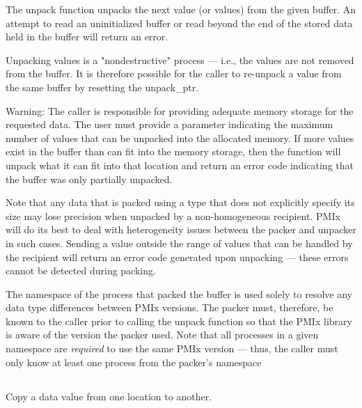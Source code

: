 \descr

The unpack function unpacks the next value (or values) from the given buffer. 
An attempt to read an uninitialized buffer or read beyond the end of the stored data held in the buffer will return an error.

Unpacking values is a "nondestructive" process --- i.e., the values are not removed from the buffer. It is therefore possible for the caller to re-unpack a value from the same buffer by resetting the unpack_ptr.

Warning: The caller is responsible for providing adequate memory storage for the requested data. The user must provide a parameter indicating the maximum number of values that can be unpacked into the allocated memory. If more values exist in the buffer than can fit into the memory storage, then the function will unpack what it can fit into that location and return an error code indicating that the buffer was only partially unpacked.

Note that any data that is packed using a type that does not explicitly specify its size may lose precision when unpacked by a non-homogeneous recipient. \ac{PMIx} will do its best to deal with heterogeneity issues between the packer and unpacker in such cases. Sending a value outside the range of values that can be handled by the recipient will return an error code generated upon unpacking --- these errors cannot be detected during packing.

The namespace of the process that packed the buffer is used solely to resolve any data type
differences between \ac{PMIx} versions. The packer must, therefore, be
known to the caller prior to calling the unpack function so that the
\ac{PMIx} library is aware of the version the packer used. Note that
all processes in a given namespace are \textit{required} to use the same \ac{PMIx}
version --- thus, the caller must only know at least one process from the
packer's namespace


\subsection{}

\summary

Copy a data value from one location to another.

\format


